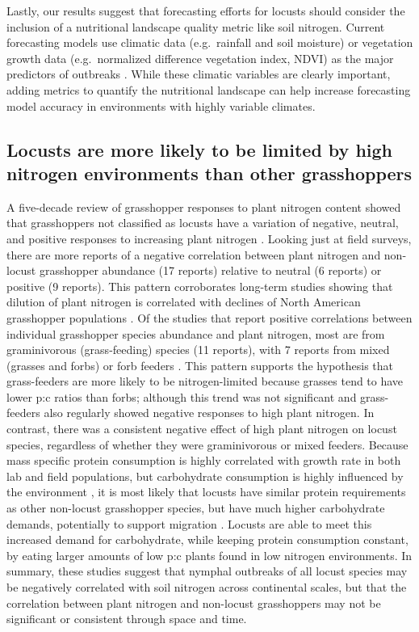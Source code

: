 \documentclass[
]{article}
\begin{document}
Lastly, our results suggest that forecasting efforts for locusts should
consider the inclusion of a nutritional landscape quality metric like
soil nitrogen. Current forecasting models use climatic data
(e.g.~rainfall and soil moisture) or vegetation growth data
(e.g.~normalized difference vegetation index, NDVI) as the major
predictors of outbreaks \citep{cressman_role_2013}. While these climatic
variables are clearly important, adding metrics to quantify the
nutritional landscape can help increase forecasting model accuracy in
environments with highly variable climates.

\subsection{Locusts are more likely to be limited by high nitrogen
environments than other
grasshoppers}\label{locusts-are-more-likely-to-be-limited-by-high-nitrogen-environments-than-other-grasshoppers}

A five-decade review of grasshopper responses to plant nitrogen content
showed that grasshoppers not classified as locusts have a variation of
negative, neutral, and positive responses to increasing plant nitrogen
\citep{cease_how_2024}. Looking just at field surveys, there are more
reports of a negative correlation between plant nitrogen and non-locust
grasshopper abundance (17 reports) relative to neutral (6 reports) or
positive (9 reports). This pattern corroborates long-term studies
showing that dilution of plant nitrogen is correlated with declines of
North American grasshopper populations \citep{welti_nutrient_2020}. Of
the studies that report positive correlations between individual
grasshopper species abundance and plant nitrogen, most are from
graminivorous (grass-feeding) species (11 reports), with 7 reports from
mixed (grasses and forbs) or forb feeders \citep{cease_how_2024}. This
pattern supports the hypothesis that grass-feeders are more likely to be
nitrogen-limited because grasses tend to have lower p:c ratios than
forbs; although this trend was not significant and grass-feeders also
regularly showed negative responses to high plant nitrogen. In contrast,
there was a consistent negative effect of high plant nitrogen on locust
species, regardless of whether they were graminivorous or mixed feeders.
Because mass specific protein consumption is highly correlated with
growth rate in both lab and field populations, but carbohydrate
consumption is highly influenced by the environment
\citep{talal_body_2023}, it is most likely that locusts have similar
protein requirements as other non-locust grasshopper species, but have
much higher carbohydrate demands, potentially to support migration
\citep{raubenheimer_integrative_1997, talal_high_2021, talal_body_2023}.
Locusts are able to meet this increased demand for carbohydrate, while
keeping protein consumption constant, by eating larger amounts of low
p:c plants found in low nitrogen environments. In summary, these studies
suggest that nymphal outbreaks of all locust species may be negatively
correlated with soil nitrogen across continental scales, but that the
correlation between plant nitrogen and non-locust grasshoppers may not
be significant or consistent through space and time.
\end{document}
